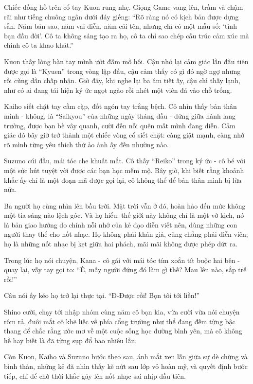\documentclass[../main.tex]{subfiles}
\begin{document}
Chiếc đồng hồ trên cổ tay Kuon rung nhẹ. Giọng Game vang lên, trầm và chậm rãi như tiếng chuông ngân dưới đáy giếng: ``Rõ ràng nó có kịch bản được dựng sẵn. Năm bản sao, năm vai diễn, năm cái tên, nhưng chỉ có một mẫu số: `tình bạn đầu đời'. Cô ta không sáng tạo ra họ, cô ta chỉ sao chép cấu trúc cảm xúc mà chính cô ta khao khát.''

Kuon thấy lòng bàn tay mình ướt đẫm mồ hôi. Cậu nhớ lại cảm giác lần đầu tiên được gọi là ``Kyuen'' trong vòng lặp đầu, cậu cảm thấy có gì đó ngờ ngợ nhưng rồi cũng dần chấp nhận. Giờ đây, khi nghe lại ba âm tiết ấy, cậu chỉ thấy lạnh, như có ai đang tái hiện ký ức ngọt ngào rồi nhét một viên đá vào chỗ trống.

Kaiho siết chặt tay cầm cặp, đốt ngón tay trắng bệch. Cô nhìn thấy bản thân mình - không, là ``Saikyou'' của những ngày tháng đầu - đứng giữa hành lang trường, được bạn bè vây quanh, cười đến nỗi quên mất mình đang diễn. Cảm giác đó bây giờ trở thành một chiếc vòng cổ siết chặt: càng giật mạnh, càng nhớ rõ mình từng yêu thích thứ ảo ảnh ấy đến nhường nào.

Suzuno cúi đầu, mái tóc che khuất mắt. Cô thấy ``Reiko'' trong ký ức - cô bé với một sức hút tuyệt vời được các bạn học mếm mộ. Bây giờ, khi biết rằng khoảnh khắc ấy chỉ là một đoạn mã được gọi lại, cô không thể để bản thân mình bị lừa nữa.

Ba người họ cùng nhìn lên bầu trời. Mặt trời vẫn ở đó, hoàn hảo đến mức không một tia sáng nào lệch góc. Và họ hiểu: thế giới này không chỉ là một vở kịch, nó là bản giao hưởng do chính nỗi nhớ của kẻ đạo diễn viết nên, dùng những con người thay thế cho nốt nhạc. Họ không phải khán giả, cũng chẳng phải diễn viên; họ là những nốt nhạc bị kẹt giữa hai phách, mãi mãi không được phép dứt ra.

Trong lúc họ nói chuyện, Kana - cô gái với mái tóc tím xoắn tít buộc hai bên - quay lại, vẫy tay gọi to: ``Ê, mấy người đứng đó làm gì thế? Mau lên nào, sắp trễ rồi!''

Câu nói ấy kéo họ trở lại thực tại. ``Đ-Được rồi! Bọn tôi tới liền!''

Shino cười, chạy tới nhập nhóm cùng năm cô bạn kia, vừa cười vừa nói chuyện rôm rả, đuôi mắt cô khẽ liếc về phía cổng trường như thể đang đếm từng bậc thang để chắc rằng ước mơ về một cuộc sống học đường bình yên, mà cô không hề hay biết là đã từng sụp đổ bao nhiêu lần.

Còn Kuon, Kaiho và Suzuno bước theo sau, ánh mắt xen lẫn giữa sự dè chừng và bình thản, những kẻ đã nhìn thấy kẽ nứt sau lớp vỏ hoàn mỹ, và quyết định bước tiếp, chỉ để chờ thời khắc gảy lên nốt nhạc sai nhịp đầu tiên.
\end{document}
